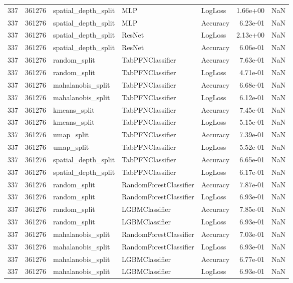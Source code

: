 \begin{tabular}{rrlllrr}
337 & 361276 & spatial\_depth\_split & MLP & LogLoss & 1.66e+00 & NaN \\
337 & 361276 & spatial\_depth\_split & MLP & Accuracy & 6.23e-01 & NaN \\
337 & 361276 & spatial\_depth\_split & ResNet & LogLoss & 2.13e+00 & NaN \\
337 & 361276 & spatial\_depth\_split & ResNet & Accuracy & 6.06e-01 & NaN \\
337 & 361276 & random\_split & TabPFNClassifier & Accuracy & 7.63e-01 & NaN \\
337 & 361276 & random\_split & TabPFNClassifier & LogLoss & 4.71e-01 & NaN \\
337 & 361276 & mahalanobis\_split & TabPFNClassifier & Accuracy & 6.68e-01 & NaN \\
337 & 361276 & mahalanobis\_split & TabPFNClassifier & LogLoss & 6.12e-01 & NaN \\
337 & 361276 & kmeans\_split & TabPFNClassifier & Accuracy & 7.45e-01 & NaN \\
337 & 361276 & kmeans\_split & TabPFNClassifier & LogLoss & 5.15e-01 & NaN \\
337 & 361276 & umap\_split & TabPFNClassifier & Accuracy & 7.39e-01 & NaN \\
337 & 361276 & umap\_split & TabPFNClassifier & LogLoss & 5.52e-01 & NaN \\
337 & 361276 & spatial\_depth\_split & TabPFNClassifier & Accuracy & 6.65e-01 & NaN \\
337 & 361276 & spatial\_depth\_split & TabPFNClassifier & LogLoss & 6.17e-01 & NaN \\
337 & 361276 & random\_split & RandomForestClassifier & Accuracy & 7.87e-01 & NaN \\
337 & 361276 & random\_split & RandomForestClassifier & LogLoss & 6.93e-01 & NaN \\
337 & 361276 & random\_split & LGBMClassifier & Accuracy & 7.85e-01 & NaN \\
337 & 361276 & random\_split & LGBMClassifier & LogLoss & 6.93e-01 & NaN \\
337 & 361276 & mahalanobis\_split & RandomForestClassifier & Accuracy & 7.03e-01 & NaN \\
337 & 361276 & mahalanobis\_split & RandomForestClassifier & LogLoss & 6.93e-01 & NaN \\
337 & 361276 & mahalanobis\_split & LGBMClassifier & Accuracy & 6.77e-01 & NaN \\
337 & 361276 & mahalanobis\_split & LGBMClassifier & LogLoss & 6.93e-01 & NaN \\

\end{tabular}
